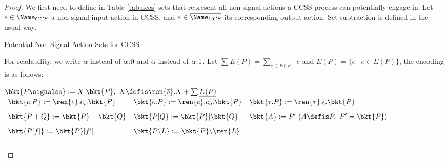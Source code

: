 \begin{proof}
  We first need to define in Table \ref{tab:accs} sets that represent all non-signal actions a CCSS process can potentially engage in.
  Let $e \in \Name_{CCS}$ a non-signal input action in CCSS, and $\bar{e} \in \overline{\Name_{CCS}}$ its corresponding output action.
  Set subtraction is defined in the usual way.
  \begin{table}[t]
    \normalsize
    \centering
    \caption{Potential Non-Signal Action Sets for CCSS}
    \label{tab:accs}
  \end{table}

  For readability, we write $\underline{\alpha}$ instead of $\alpha\hspace{-0.8mm}:\hspace{-0.8mm}0$ and $\alpha$ instead of $\alpha\hspace{-0.8mm}:\hspace{-0.8mm}1$.
  Let $\sum E(P) = \sum_{e\in E(P)}e$ and $\underline{E(P)} = \{\underline{e} \mid e \in E(P)\}$, the encoding is as follows:

  \begin{center}
  \hspace{-4.25cm}$\bkt{P\signals s} := X | \bkt{P},\ X \defis \ren{\overline{s}}.X + \sum \underline{E(P)} $\\[2ex]
  $\begin{array}{lll}
  \bkt{e.P} := \ren{e}.\overline{\underline{e_i}}.\bkt{P} &
  \bkt{\overline{e}.P} := \ren{\overline{e}}.\overline{\underline{e_o}}.\bkt{P} &
  \bkt{\tau.P} := \ren{\tau}.\overline{\underline{\epsilon}}.\bkt{P}
  \\[2ex]
  \bkt{P + Q} := \bkt{P} + \bkt{Q} &
  \bkt{P | Q} := \bkt{P} | \bkt{Q} &
  \bkt{A} := P'\ (A\defis P,\ P'=\bkt{P})
  \\[2ex]
  \bkt{P[f]} := \bkt{P}[f'] &
  \bkt{P\backslash L} := \bkt{P} \backslash \ren{L}
  \\[2ex]
  \end{array}$
  \end{center}


\end{proof}

